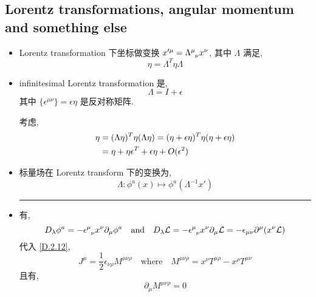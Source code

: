 \subsection{Lorentz transformations, angular momentum and something else}
\begin{itemize}
	\item Lorentz transformation 下坐标做变换 $x'^\mu = \tensor{\Lambda}{^\mu_\nu} x^\nu$, 其中 $\Lambda$ 满足,
	\begin{equation}
		\eta = \Lambda^T \eta \Lambda
	\end{equation}
	
	\item infinitesimal Lorentz transformation 是,
	\begin{equation}
		\Lambda = I + \epsilon
	\end{equation}
	其中 $\{\epsilon^{\mu \nu}\} = \epsilon \eta$ 是反对称矩阵.
	
	\begin{tcolorbox}[title=proof:]
		考虑,
		\begin{align}
			\eta &= (\Lambda \eta)^T \eta (\Lambda \eta) = (\eta + \epsilon \eta)^T \eta (\eta + \epsilon \eta) \notag \\
			&= \eta + \eta \epsilon^T + \epsilon \eta + O(\epsilon^2)
		\end{align}
	\end{tcolorbox}
	
	\noindent\hdashrule[0.5ex]{\linewidth}{0.5pt}{1mm} %
	
	\item 标量场在 Lorentz transform 下的变换为,
	\begin{equation}
		\Lambda : \phi^a(x) \mapsto \phi^a(\Lambda^{- 1} x')
	\end{equation}
	
	\noindent\rule[0.5ex]{\linewidth}{0.5pt} %
	
	\item 有,
	\begin{equation}
		D_\lambda \phi^a = - \tensor{\epsilon}{^\mu_\nu} x^\nu \partial_\mu \phi^a \quad \text{and} \quad D_\lambda \mathcal{L} = - \tensor{\epsilon}{^\mu_\nu} x^\nu \partial_\mu \mathcal{L} = - \epsilon_{\mu \nu} \partial^\mu(x^\nu \mathcal{L})
	\end{equation}
	代入 \eqref{D.2.12},
	\begin{equation}
		J^\mu = \frac{1}{2} \epsilon_{\nu \rho} M^{\mu \nu \rho} \quad \text{where} \quad M^{\mu \nu \rho} = x^\nu T^{\mu \rho} - x^\rho T^{\mu \nu}
	\end{equation}
	且有,
	\begin{equation}
		\partial_\mu M^{\mu \nu \rho} = 0
	\end{equation}
	

\end{itemize}
